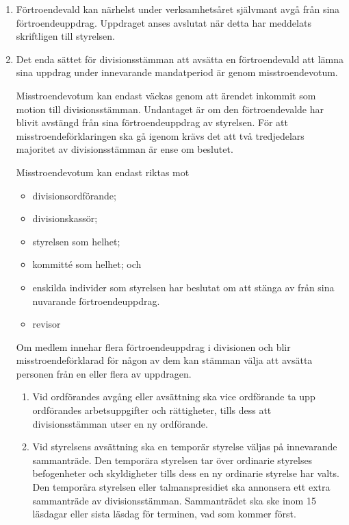 \documentclass{dvd}
\begin{document}
	\begin{enumerate}[label=\arabic* §, ref=\arabic*]
		\item Förtroendevald kan närhelst under verksamhetsåret självmant avgå från sina förtroendeuppdrag.
		Uppdraget anses avslutat när detta har meddelats skriftligen till styrelsen.

		\item Det enda sättet för divisionsstämman att avsätta en förtroendevald att lämna sina uppdrag under innevarande mandatperiod är genom misstroendevotum.

		Misstroendevotum kan endast väckas genom att ärendet inkommit som motion till divisionsstämman.
		Undantaget är om den förtroendevalde har blivit avstängd från sina förtroendeuppdrag av styrelsen.
		För att misstroendeförklaringen ska gå igenom krävs det att två tredjedelars majoritet av divisionsstämman är ense om beslutet.

		Misstroendevotum kan endast riktas mot
		\begin{itemize}
			\item divisionsordförande;
			\item divisionskassör;
			\item styrelsen som helhet;
			\item kommitté som helhet; och
			\item enskilda individer som styrelsen har beslutat om att stänga av från sina nuvarande förtroendeuppdrag.
			\item revisor
		\end{itemize}

		Om medlem innehar flera förtroendeuppdrag i divisionen och blir misstroendeförklarad för någon av dem kan stämman välja att avsätta personen från en eller flera av uppdragen.

		\begin{enumerate}[label=\theenumi~\alph* §, ref=\theenumi~\alph*]
			\item Vid ordförandes avgång eller avsättning ska vice ordförande ta upp ordförandes arbetsuppgifter och rättigheter, tills dess att divisionsstämman utser en ny ordförande.

			\item 
		Vid styrelsens avsättning ska en temporär styrelse väljas på innevarande sammanträde.
		Den temporära styrelsen tar över ordinarie styrelses befogenheter och skyldigheter tills dess en ny ordinarie styrelse har valts.
		Den temporära styrelsen eller talmanspresidiet ska annonsera ett extra sammanträde av divisionsstämman.
		Sammanträdet ska ske inom 15 läsdagar eller sista läsdag för terminen, vad som kommer först.
		\end{enumerate}


\end{enumerate}
\end{document}
